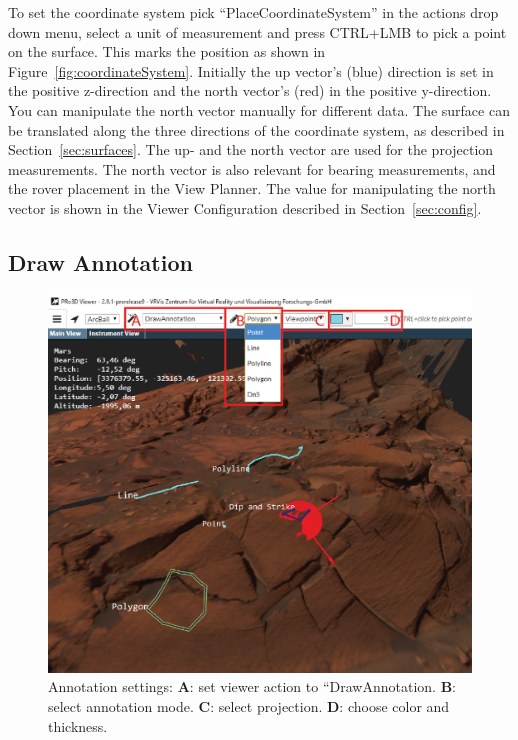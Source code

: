 To set the coordinate system pick ``PlaceCoordinateSystem'' in the actions drop down menu, select a unit of measurement and press CTRL+LMB to pick a point on the surface. This marks the position as shown in Figure~\ref{fig:coordinateSystem}.
Initially the up vector's (blue) direction is set in the positive z-direction and the north vector's (red) in the positive y-direction. You can manipulate the north vector manually for different data. The surface can be translated along the three directions of the coordinate system, as described in Section~\ref{sec:surfaces}. The up- and the north vector are used for the projection measurements. The north vector is also relevant for bearing measurements, and the rover placement in the View Planner.
The value for manipulating the north vector is shown in the Viewer Configuration described in Section~\ref{sec:config}.
\subsection{Draw Annotation}
\label{sec:drawAnnotation}

\begin{figure}[h]
    	\centering
    		\includegraphics[width=1\textwidth]{pics/drawAnnotationsAI.png}
    	\caption[Draw Annotations]{Annotation settings: \textbf{A}: set viewer action to ``DrawAnnotation. \textbf{B}: select annotation mode. \textbf{C}: select projection. \textbf{D}: choose color and thickness. }
    	\label{fig:drawAnnotations}
   \end{figure}
	
